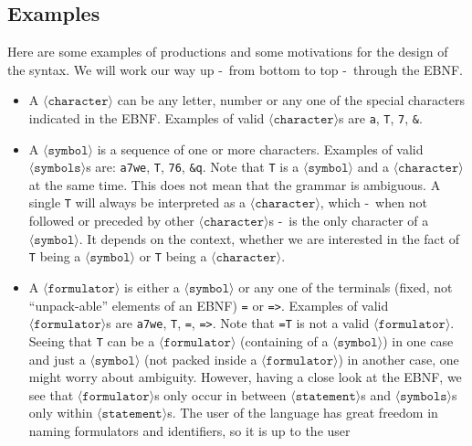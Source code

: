 \documentclass[british]{article}
\newcommand\prv{bc}
\newcommand\m[1]{\texttt{#1}}
\begin{document}
\pagebreak{}

\subsection{Examples}

Here are some examples of productions and some motivations for the
design of the syntax. We will work our way up -\ from bottom to top -\ through
the EBNF\@.

\begin{itemize}
	\item
		A $\langle\texttt{character}\rangle$ can be any letter, number or any
		one of the special characters indicated in the EBNF\@. Examples
		of valid $\langle\texttt{character}\rangle$s are \m{a}, \m{T},
		\m{7}, \m{&}.
	\item
		A $\langle\texttt{symbol}\rangle$ is a sequence of one or more
		characters. Examples of valid $\langle\texttt{symbols}\rangle$s are:
		\m{a7we}, \m{T}, \m{76}, \m{&q}. Note that \m{T} is a
		$\langle\texttt{symbol}\rangle$ and a $\langle\texttt{character}\rangle$
		at the same time. This does not mean that the grammar is ambiguous.  A
		single \m{T} will always be interpreted as a
		$\langle\texttt{character}\rangle$, which -\ when not followed or
		preceded by other $\langle\texttt{character}\rangle$s -\ is the only
		character of a $\langle\texttt{symbol}\rangle$. It depends on the
		context, whether we are interested in the fact of \m{T} being a
		$\langle\texttt{symbol} \rangle$ or \m{T} being a
		$\langle\texttt{character}\rangle$.
	\item
		A $\langle\texttt{formulator}\rangle$ is either a
		$\langle\texttt{symbol}\rangle$ or any one of the terminals (fixed, not
		``unpack-able'' elements of an EBNF) \m{=} or \m{=>}. Examples of valid
		$\langle\texttt{formulator}\rangle$s are \m{a7we}, \m{T}, \m{=}, \m{=>}.
		Note that \m{=T} is not a valid $\langle\texttt{formulator}\rangle$.
		Seeing that \m{T} can be a $\langle\texttt{formulator}\rangle$
		(containing of a $\langle\texttt{symbol}\rangle$) in one case and just a
		$\langle\texttt{symbol}\rangle$ (not packed inside a
		$\langle\texttt{formulator}\rangle$) in another case, one might worry
		about ambiguity. However, having a close look at the EBNF, we see that
		$\langle\texttt{formulator}\rangle$s only occur in between
		$\langle\texttt{statement}\rangle$s and
		$\langle\texttt{symbols}\rangle$s only within
		$\langle\texttt{statement}\rangle$s. The user of the language has great
		freedom in naming formulators and identifiers, so it is up to the user

\end{itemize}
\end{document}

